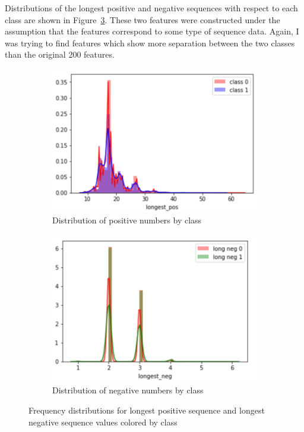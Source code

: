 \documentclass[11pt,letterpaper]{article}
\begin{document}
Distributions of the longest positive and negative sequences with respect to
each class are shown in Figure~\ref{fig:count_dist}.  These two features were
constructed under the assumption that the features correspond to some type of
sequence data.  Again, I was trying to find features which show more separation
between the two classes than the original 200 features.

\begin{figure}[h!]
    \centering
    \begin{subfigure}[]{.4\textwidth}
        \includegraphics[width=\textwidth]{long_pos_dist.png}
        \caption{Distribution of positive numbers by class}
        \label{fig:pos_dist}
    \end{subfigure}
    \begin{subfigure}[]{.4\textwidth}
        \includegraphics[width=\textwidth]{long_neg_dist.png}
        \caption{Distribution of negative numbers by class}
        \label{fig:neg_dist}
    \end{subfigure}
    \caption{Frequency distributions for longest positive sequence and longest
negative sequence values colored by class}
    \label{fig:count_dist}
\end{figure}
\end{document}
